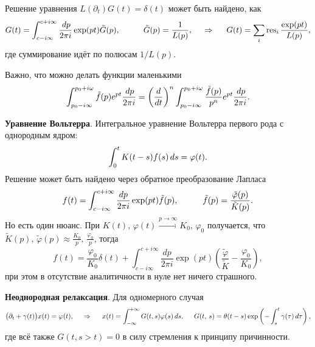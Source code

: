 Решение уравнения $L(\partial_t) G(t) = \delta(t)$ может быть найдено, как
\begin{equation*}
    G(t) = \int_{c-i \infty}^{c+i \infty} \frac{\d p}{2 \pi i} \exp(p t) \tilde{G}(p),
    \hspace{10 mm} \tilde{G} (p) = \frac{1}{L(p)},
    \hspace{0.5cm} \Rightarrow \hspace{0.5cm}
    G(t) = \sum_i \res_i \frac{\exp(pt)}{L(p)},
\end{equation*}
где суммирование идёт по полюсам $1/L(p)$. 

Важно, что можно делать функции маленькими
\begin{equation}
    \int_{p_0 - i \infty}^{p_0 + i \omega} \tilde{f}(p) e^{pt} \frac{\, d p}{2 \pi i} = 
    \left(\frac{d }{d t} \right)^n \int_{p_0 - i \infty}^{p_0 + i \omega} \frac{\tilde{f}(p)}{p^n} e^{pt} \frac{\, d p}{2 \pi i}.
\end{equation}




\textbf{Уравнение Вольтерра}. Интегральное уравнение Вольтерра первого рода с однородным ядром:
\begin{equation*}
    \int_{0}^{t}  K(t-s) f(s) \, d s = \varphi(t).
\end{equation*}
Решение может быть найдено через обратное преобразование Лапласа
\begin{equation*}
    f(t) = \int_{c-i \infty}^{c+i \infty} \frac{d p}{2 \pi i} \exp(pt) \tilde{f}(p),
    \hspace{10 mm} 
    \tilde{f}(p) = \frac{\tilde{\varphi}(p)}{\tilde{K}(p)}.
\end{equation*}
Но есть один нюанс. При $K(t),\, \varphi(t) \overset{p \to \infty}{\to} K_0,\, \varphi_0$ получается, что $\tilde{K}(p),\, \tilde{\varphi}(p) \approx \frac{K_0}{p},\, \frac{\varphi_0}{p}$, тогда
\begin{equation*}
    f(t) = \frac{\varphi_0}{K_0} \delta(t) + \int_{c-i \infty}^{c+i \infty} \frac{d p}{2 \pi i} \exp(p t)
    \left(
        \frac{\tilde{\varphi}}{\tilde{K}} - \frac{\varphi_0}{K_0}
    \right),
\end{equation*}
при этом в отсутствие аналитичности в нуле нет ничего страшного. 


\textbf{Неоднородная релаксация}. Для одномерного случая
\begin{equation*}
    \big(\partial_t + \gamma(t)\big) x(t) = \varphi(t),
    \hspace{0.5cm} \Rightarrow \hspace{0.5cm}
    x(t) = \int_{-\infty}^{+\infty}  G(t,s) \varphi(s) \, d s,
    \hspace{5 mm} 
    G(t,\,  s) = \theta(t-s) \exp\left(
        - \int_{s}^{t} \gamma(\tau) \, d \tau
    \right),
\end{equation*}
где всё также $G(t, s>t) = 0$ в силу стремления к принципу причинности. 




